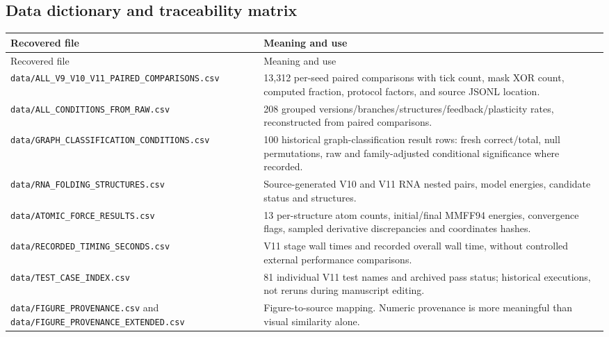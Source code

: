 \documentclass[11pt,a4paper]{article}
\begin{document}
\subsection{Data dictionary and traceability matrix}
\begin{center}\footnotesize
\begin{longtable}{p{}p{}}
\toprule
Recovered file & Meaning and use\\\midrule\endfirsthead\toprule Recovered file & Meaning and use\\\midrule\endhead
\texttt{data/ALL\_V9\_V10\_V11\_PAIRED\_COMPARISONS.csv} & 13,312 per-seed paired comparisons with tick count, mask XOR count, computed fraction, protocol factors, and source JSONL location.\\
\texttt{data/ALL\_CONDITIONS\_FROM\_RAW.csv} & 208 grouped versions/branches/structures/feedback/plasticity rates, reconstructed from paired comparisons.\\
\texttt{data/GRAPH\_CLASSIFICATION\_CONDITIONS.csv} & 100 historical graph-classification result rows: fresh correct/total, null permutations, raw and family-adjusted conditional significance where recorded.\\
\texttt{data/RNA\_FOLDING\_STRUCTURES.csv} & Source-generated V10 and V11 RNA nested pairs, model energies, candidate status and structures.\\
\texttt{data/ATOMIC\_FORCE\_RESULTS.csv} & 13 per-structure atom counts, initial/final MMFF94 energies, convergence flags, sampled derivative discrepancies and coordinates hashes.\\
\texttt{data/RECORDED\_TIMING\_SECONDS.csv} & V11 stage wall times and recorded overall wall time, without controlled external performance comparisons.\\
\texttt{data/TEST\_CASE\_INDEX.csv} & 81 individual V11 test names and archived pass status; historical executions, not reruns during manuscript editing.\\
\texttt{data/FIGURE\_PROVENANCE.csv} and \texttt{data/FIGURE\_PROVENANCE\_EXTENDED.csv} & Figure-to-source mapping. Numeric provenance is more meaningful than visual similarity alone.\\
\bottomrule
\end{longtable}
\end{center}
\end{document}
